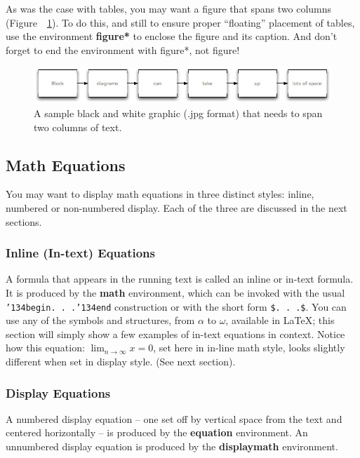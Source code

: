 \documentclass{nime-alternate}
\begin{document}
As was the case with tables, you may want a figure that spans two columns (Figure~~\ref{fig:BlockDiagram2}). To do this, and still to ensure proper ``floating'' placement of tables, use the environment \textbf{figure*} to enclose the figure and its caption. And don't forget to end the environment with {figure*}, not {figure}!

\begin{figure}[htbp]
	\centering
		\includegraphics[width=1\textwidth]{BlockDiagram2}
	\caption{A sample black and white graphic (.jpg format) that needs to span two columns of text.}
	\label{fig:BlockDiagram2}
\end{figure}

\subsection{Math Equations}
You may want to display math equations in three distinct styles:
inline, numbered or non-numbered display.  Each of
the three are discussed in the next sections.

\subsubsection{Inline (In-text) Equations}
A formula that appears in the running text is called an
inline or in-text formula.  It is produced by the
\textbf{math} environment, which can be
invoked with the usual \texttt{{\char'134}begin. . .{\char'134}end}
construction or with the short form \texttt{\$. . .\$}. You
can use any of the symbols and structures,
from $\alpha$ to $\omega$, available in
\LaTeX \cite{Lamport:LaTeX}; this section will simply show a
few examples of in-text equations in context. Notice how
this equation: \begin{math}\lim_{n\rightarrow \infty}x=0\end{math},
set here in in-line math style, looks slightly different when
set in display style.  (See next section).

\subsubsection{Display Equations}
A numbered display equation -- one set off by vertical space
from the text and centered horizontally -- is produced
by the \textbf{equation} environment. An unnumbered display
equation is produced by the \textbf{displaymath} environment.
\end{document}
